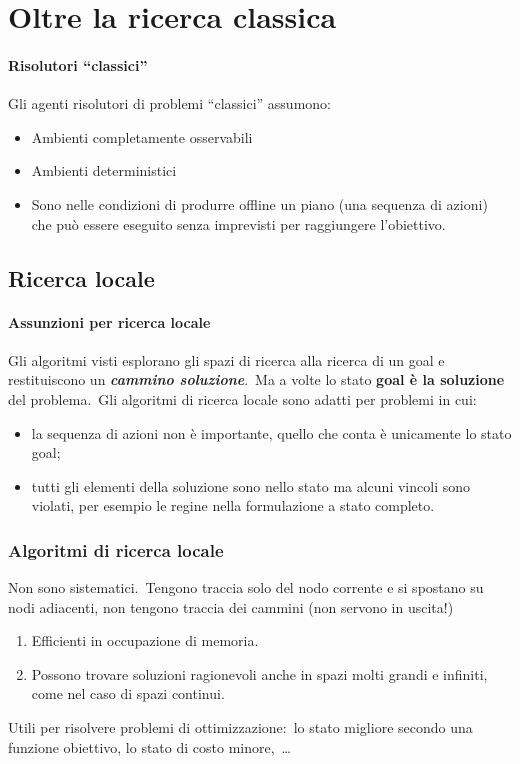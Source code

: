 \chapter{Oltre la ricerca classica}

\subsubsection{Risolutori ``classici''}

Gli agenti risolutori di problemi ``classici'' assumono:
\begin{itemize}
	\item Ambienti completamente osservabili
	\item Ambienti deterministici
	\item Sono nelle condizioni di produrre offline un piano (una sequenza di azioni) che può essere eseguito senza imprevisti per raggiungere l'obiettivo.
\end{itemize}

\section{Ricerca locale}

\subsubsection{Assunzioni per ricerca locale}

Gli algoritmi visti esplorano gli spazi di ricerca alla ricerca di un goal e restituiscono un \textbf{\textit{cammino soluzione}}.\
Ma a volte lo stato \textbf{goal è la soluzione} del problema.\
Gli algoritmi di ricerca locale sono adatti per problemi in cui:
\begin{itemize}
	\item la sequenza di azioni non è importante, quello che conta è unicamente lo stato goal;
	\item tutti gli elementi della soluzione sono nello stato ma alcuni vincoli sono violati, per esempio le regine nella formulazione a stato completo.
\end{itemize}

\subsection{Algoritmi di ricerca locale}

Non sono sistematici.\
Tengono traccia solo del nodo corrente e si spostano su nodi adiacenti, non tengono traccia dei cammini (non servono in uscita!)
\begin{enumerate}
	\item Efficienti in occupazione di memoria.
	\item Possono trovare soluzioni ragionevoli anche in spazi molti grandi e infiniti, come nel caso di spazi continui.\
\end{enumerate}
Utili per risolvere problemi di ottimizzazione:\ lo stato migliore secondo una funzione obiettivo, lo stato di costo minore,\ \dots

